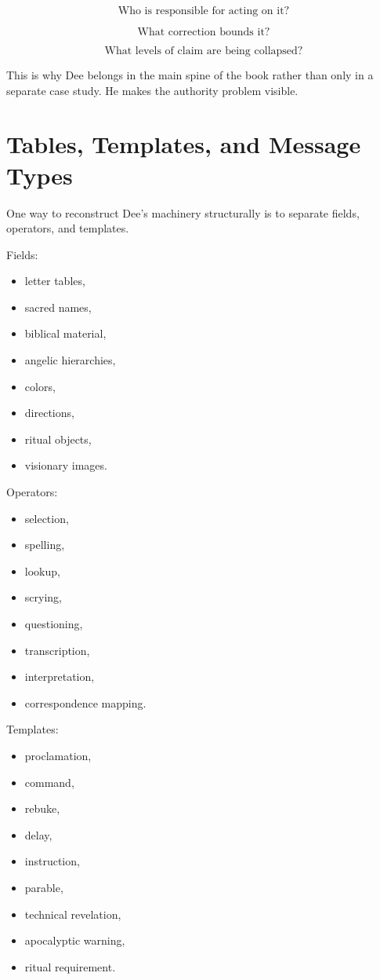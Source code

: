 \documentclass[11pt]{book}
\begin{document}
\[
\text{Who is responsible for acting on it?}
\]

\[
\text{What correction bounds it?}
\]

\[
\text{What levels of claim are being collapsed?}
\]

This is why Dee belongs in the main spine of the book rather than only in a separate case study. He makes the authority problem visible.

\section{Tables, Templates, and Message Types}

One way to reconstruct Dee's machinery structurally is to separate fields, operators, and templates.

Fields:

\begin{itemize}
    \item letter tables,
    \item sacred names,
    \item biblical material,
    \item angelic hierarchies,
    \item colors,
    \item directions,
    \item ritual objects,
    \item visionary images.
\end{itemize}

Operators:

\begin{itemize}
    \item selection,
    \item spelling,
    \item lookup,
    \item scrying,
    \item questioning,
    \item transcription,
    \item interpretation,
    \item correspondence mapping.
\end{itemize}

Templates:

\begin{itemize}
    \item proclamation,
    \item command,
    \item rebuke,
    \item delay,
    \item instruction,
    \item parable,
    \item technical revelation,
    \item apocalyptic warning,
    \item ritual requirement.
\end{itemize}
\end{document}
